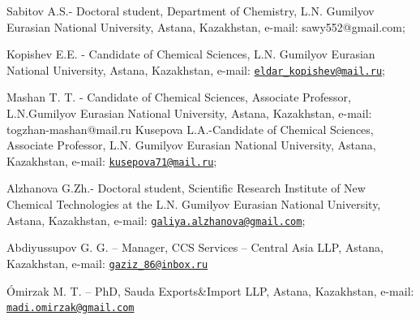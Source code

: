 Sabitov A.S.- Doctoral student, Department of Chemistry, L.N. Gumilyov
Eurasian National University, Astana, Kazakhstan, e-mail:
sawy552@gmail.com;

Kopishev E.E. - Candidate of Chemical Sciences, L.N. Gumilyov Eurasian
National University, Astana, Kazakhstan, e-mail:
\href{mailto:eldar_kopishev@mail.ru}{\nolinkurl{eldar\_kopishev@mail.ru}};

Mashan T. T. - Candidate of Chemical Sciences, Associate Professor,
L.N.Gumilyov Eurasian National University, Astana, Kazakhstan, e-mail:
togzhan-mashan@mail.ru Kusepova L.A.-Candidate of Chemical Sciences,
Associate Professor, L.N. Gumilyov Eurasian National University, Astana,
Kazakhstan, e-mail:
\href{mailto:kusepova71@mail.ru}{\nolinkurl{kusepova71@mail.ru}};

Alzhanova G.Zh.- Doctoral student, Scientific Research Institute of New
Chemical Technologies at the L.N. Gumilyov Eurasian National University,
Astana, Kazakhstan, e-mail:
\href{mailto:galiya.alzhanova@gmail.com}{\nolinkurl{galiya.alzhanova@gmail.com}};

Abdiyussupov G. G. -- Manager, CCS Services -- Central Asia LLP, Astana,
Kazakhstan, e-mail:
\href{mailto:gaziz_86@inbox.ru}{\nolinkurl{gaziz\_86@inbox.ru}}

Ómirzak M. T. -- PhD, Sauda Exports\&Import LLP, Astana, Kazakhstan,
e-mail:
\href{mailto:madi.omirzak@gmail.com}{\nolinkurl{madi.omirzak@gmail.com}}\